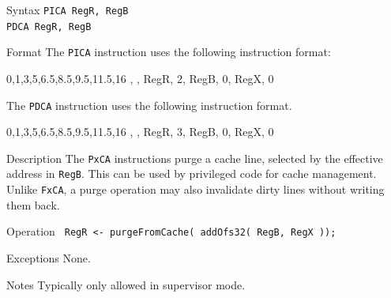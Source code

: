 %
%
\pagebreak
{}

\begin{iPageDescEntry}{Syntax}
    \texttt{PICA RegR, RegB} \\
    \texttt{PDCA RegR, RegB}
\end{iPageDescEntry}

\begin{iPageDescEntry}{Format}
    The \texttt{PICA} instruction uses the following instruction format: \\

    \begin{flushleft}
    \drawInstrFormat
        {0,1,3,5,6.5,8.5,9.5,11.5,16}
        {\OpCodeGrpSYS, \OpCodePCA, RegR, 2, RegB, 0, RegX, 0}
    \end{flushleft}
    
    The \texttt{PDCA} instruction uses the following instruction format. \\

    \begin{flushleft}
    \drawInstrFormat
        {0,1,3,5,6.5,8.5,9.5,11.5,16}
        {\OpCodeGrpSYS, \OpCodePCA, RegR, 3, RegB, 0, RegX, 0}
    \end{flushleft}
\end{iPageDescEntry}

\begin{iPageDescEntry}{Description}
    The \texttt{PxCA} instructions purge a cache line, selected by the effective address
    in \texttt{RegB}. This can be used by privileged code for cache management. Unlike \texttt{FxCA}, a purge operation may also invalidate dirty lines without writing them back.
   
\end{iPageDescEntry}

\begin{iPageDescEntry}{Operation}
    \texttt{ RegR <- purgeFromCache( addOfs32( RegB, RegX ));}
\end{iPageDescEntry}

\begin{iPageDescEntry}{Exceptions}
    None.
\end{iPageDescEntry}

\begin{iPageDescEntry}{Notes}
    Typically only allowed in supervisor mode.
\end{iPageDescEntry}
